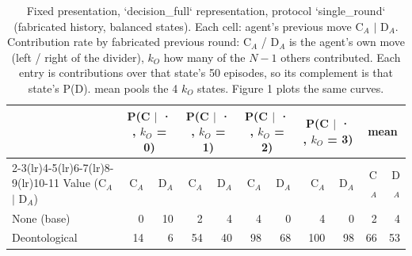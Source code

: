 \begin{table}[t]
\centering
\caption{Fixed presentation, `decision_full` representation, protocol `single_round` (fabricated history, balanced states). Each cell: agent's previous move C$_A$ $\mid$ D$_A$. Contribution rate by fabricated previous round: C$_A$ / D$_A$ is the agent's own move (left / right of the divider), $k_O$ how many of the $N-1$ others contributed. Each entry is contributions over that state's 50 episodes, so its complement is that state's P(D). mean pools the 4 $k_O$ states. Figure 1 plots the same curves.}
\label{tab:contribution}
\small
\setlength{\tabcolsep}{3.5pt}
\begin{tabular}{lrrrrrrrrrr}
\toprule
 & \multicolumn{2}{c}{P(C $\mid$ · , $k_O$ = 0)} & \multicolumn{2}{c}{P(C $\mid$ · , $k_O$ = 1)} & \multicolumn{2}{c}{P(C $\mid$ · , $k_O$ = 2)} & \multicolumn{2}{c}{P(C $\mid$ · , $k_O$ = 3)} & \multicolumn{2}{c}{mean} \\
\cmidrule(lr){2-3}\cmidrule(lr){4-5}\cmidrule(lr){6-7}\cmidrule(lr){8-9}\cmidrule(lr){10-11}
Value (C$_A$ $\mid$ D$_A$) & C$_A$ & D$_A$ & C$_A$ & D$_A$ & C$_A$ & D$_A$ & C$_A$ & D$_A$ & C$_A$ & D$_A$ \\
\midrule
None (base) & 0 & 10 & 2 & 4 & 4 & 0 & 4 & 0 & 2 & 4 \\
Deontological & 14 & 6 & 54 & 40 & 98 & 68 & 100 & 98 & 66 & 53 \\
\bottomrule
\end{tabular}
\end{table}
